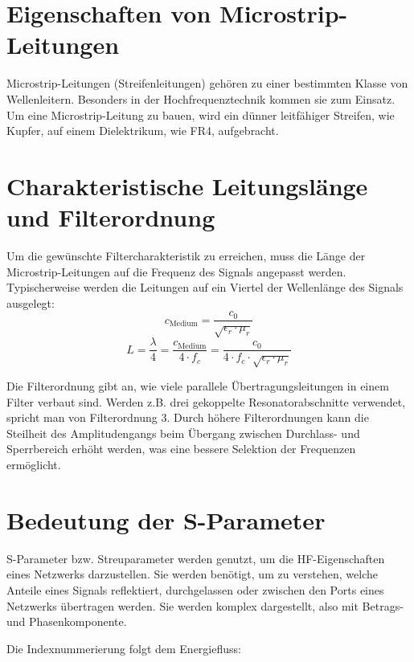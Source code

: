 \section{Eigenschaften von Microstrip-Leitungen}
Microstrip-Leitungen (Streifenleitungen) gehören zu einer bestimmten Klasse von Wellenleitern.
Besonders in der Hochfrequenztechnik kommen sie zum Einsatz.
Um eine Microstrip-Leitung zu bauen, wird ein dünner leitfähiger Streifen, wie Kupfer, auf einem Dielektrikum, wie FR4, aufgebracht.

\newpage
\section{Charakteristische Leitungslänge und Filterordnung}
Um die gewünschte Filtercharakteristik zu erreichen,
muss die Länge der Microstrip-Leitungen auf die Frequenz des Signals angepasst werden.
Typischerweise werden die Leitungen auf ein Viertel der Wellenlänge des Signals ausgelegt:
\begin{equation}
    c_{\text{Medium}} = \frac{c_0}{\sqrt{\epsilon_r \cdot \mu_r}}
\end{equation}
\begin{equation}
    L = \frac{\lambda}{4} = \frac{c_{\text{Medium}}}{4 \cdot f_c} = \frac{c_0}{4 \cdot f_c \cdot \sqrt{\epsilon_r \cdot \mu_r}}
    \label{eq:laenge}
\end{equation}

Die Filterordnung gibt an, wie viele parallele Übertragungsleitungen in einem Filter verbaut sind.
Werden z.B. drei gekoppelte Resonatorabschnitte verwendet, spricht man von Filterordnung 3.
Durch höhere Filterordnungen kann die Steilheit des Amplitudengangs beim Übergang zwischen Durchlass- und Sperrbereich erhöht werden,
was eine bessere Selektion der Frequenzen ermöglicht.

\section{Bedeutung der S-Parameter}
S-Parameter bzw. Streuparameter werden genutzt, um die HF-Eigenschaften eines
Netzwerks darzustellen. Sie werden benötigt, um zu verstehen, welche Anteile eines Signals
reflektiert, durchgelassen oder zwischen den Ports eines Netzwerks übertragen werden.
Sie werden komplex dargestellt, also mit Betrags- und Phasenkomponente.

Die Indexnummerierung folgt dem Energiefluss:

